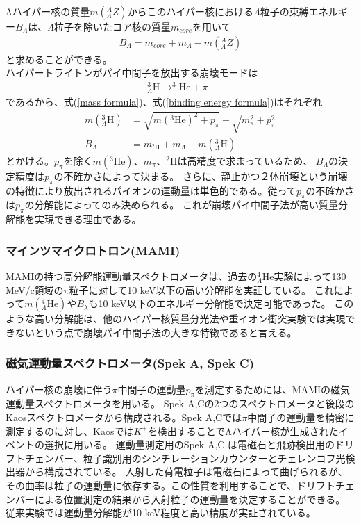 \documentclass[a4paper,11pt,uplatex]{jsbook}
\begin{document}
Λハイパー核の質量$m(^A_\Lambda Z)$からこのハイパー核における$\Lambda$粒子の束縛エネルギー$B_\Lambda$は、$\Lambda$粒子を除いたコア核の質量$m_{core}$を用いて
\begin{eqnarray}
  B_\Lambda = m_{core} + m_\Lambda - m(^A_\Lambda Z) \label{binding energy formula}
\end{eqnarray}
と求めることができる。
\\ハイパートライトンがパイ中間子を放出する崩壊モードは
\begin{eqnarray}
  ^3_{\Lambda}\text{H} \rightarrow ^3\text{He} + \pi^-
\end{eqnarray}
であるから、式(\ref{mass formula})、式(\ref{binding energy formula})はそれぞれ
\begin{eqnarray}
  m(^3_\Lambda \text{H}) &= \sqrt{m(^3\text{He})^2 + p_\pi} + \sqrt{m_\pi^2 + p_\pi^2} \\
  B_\Lambda &= m_{^2\text{H}} + m_\Lambda - m(^3_\Lambda \text{H})
\end{eqnarray}
とかける。$p_\pi$を除く$m(^3\text{He})$、$m_\pi$、$^2\text{H}$は高精度で求まっているため、
$B_\Lambda$の決定精度は$p_\pi$の不確かさによって決まる。
さらに、静止かつ２体崩壊という崩壊の特徴により放出されるパイオンの運動量は単色的である。従って$p_\pi$の不確かさは$p_\pi$の分解能によってのみ決められる。
これが崩壊パイ中間子法が高い質量分解能を実現できる理由である。
\subsubsection{マインツマイクロトロン(MAMI)}
MAMIの持つ高分解能運動量スペクトロメータは、過去の$^4_\Lambda \text{He}$実験によって130 MeV/c領域の$\pi$粒子に対して10 keV以下の高い分解能を実証している。
これによって$m(^4_\Lambda \text{He})$や$B_\lambda$も10 keV以下のエネルギー分解能で決定可能であった。
このような高い分解能は、他のハイパー核質量分光法や重イオン衝突実験では実現できないという点で崩壊パイ中間子法の大きな特徴であると言える。
\subsubsection{磁気運動量スペクトロメータ(Spek A, Spek C)}
ハイパー核の崩壊に伴う$\pi$中間子の運動量$p_\pi$を測定するためには、MAMIの磁気運動量スペクトロメータを用いる。
Spek A,Cの2つのスペクトロメータと後段のKaosスペクトロメータから構成される。Spek A,Cでは$\pi$中間子の運動量を精密に測定するのに対し、Kaosでは$K^+$を検出することでΛハイパー核が生成されたイベントの選択に用いる。
運動量測定用のSpek A,C は電磁石と飛跡検出用のドリフトチェンバー、粒子識別用のシンチレーションカウンターとチェレンコフ光検出器から構成されている。
入射した荷電粒子は電磁石によって曲げられるが、その曲率は粒子の運動量に依存する。この性質を利用することで、ドリフトチェンバーによる位置測定の結果から入射粒子の運動量を決定することができる。
従来実験では運動量分解能が10 keV程度と高い精度が実証されている。
\end{document}

